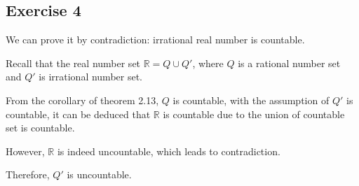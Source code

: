 \subsection*{Exercise 4}
We can prove it by contradiction: irrational real number is countable.

Recall that the real number set $\mathbb{R} = Q \cup Q'$, where $Q$ is a rational number set and $Q'$ is irrational number set.

From the corollary of theorem 2.13, $Q$ is countable, with the assumption of $Q'$ is countable, it can be deduced that $\mathbb{R}$ is countable due to the union of countable set is countable.

However, $\mathbb{R}$ is indeed uncountable, which leads to contradiction.

Therefore, $Q'$ is uncountable.

